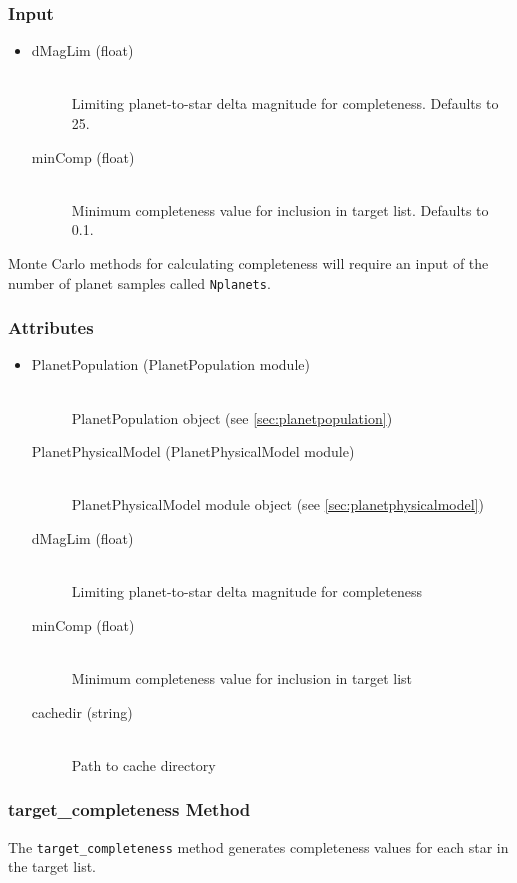 \documentclass[cleanfoot]{asme2ej}
\begin{document}
\subsubsection*{Input}
\begin{itemize}
\item 
\begin{description}
    \item[dMagLim (float)] \hfill \\ Limiting planet-to-star delta magnitude for completeness. Defaults to 25.
    \item[minComp (float)] \hfill \\ Minimum completeness value for inclusion in target list.  Defaults to 0.1.
\end{description}
\end{itemize}
Monte Carlo methods for calculating completeness will require an input of the number of planet samples called \verb+Nplanets+. 

\subsubsection*{Attributes}
\begin{itemize}
\item 
\begin{description}
    \item[PlanetPopulation (PlanetPopulation module)] \hfill \\ PlanetPopulation object (see \ref{sec:planetpopulation})
    \item[PlanetPhysicalModel (PlanetPhysicalModel module)] \hfill \\ PlanetPhysicalModel module object (see \ref{sec:planetphysicalmodel}) 
    \item[dMagLim (float)] \hfill \\ Limiting planet-to-star delta magnitude for completeness
    \item[minComp (float)] \hfill \\ Minimum completeness value for inclusion in target list
    \item[cachedir (string)] \hfill \\ Path to cache directory
\end{description}
\end{itemize}

\subsubsection{target\_completeness Method}
\label{sec:targetcompletenesstask}
The \verb+target_completeness+ method generates completeness values for each star in the target list.
\end{document}

